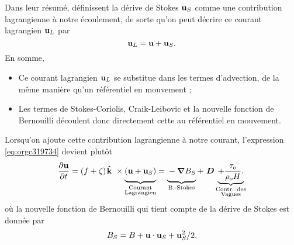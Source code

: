\documentclass[10pt]{article}
\numberwithin{equation}{section}
\newcommand{\kvf}{\vb{\hat{k}}}
\newcommand{\uu}{\vb{u}}
\newcommand{\grande}{\vphantom{\frac{1}{xx}}}
\newcommand{\pt}{\hspace{1pt}} %
\begin{document}
Dans leur résumé, \Textcite{suzuki2016understanding}  définissent la dérive de Stokes \(\uu_S\) comme une contribution lagrangienne à notre écoulement, de sorte qu'on peut décrire ce courant lagrangien \(\uu_L\) par
\begin{equation}
   \uu_L = \uu + \uu_S.
\end{equation}
En somme, 
\begin{itemize}
\item Ce courant lagrangien \(\uu_L\) se substitue dans les termes d'advection, de la même manière qu'un référentiel en mouvement ;
\item Les termes de Stokes-Coriolis, Craik-Leibovic et la nouvelle fonction de Bernouilli découlent donc directement cette au référentiel en mouvement. \bigskip
\end{itemize}

Lorsqu'on ajoute cette contribution lagrangienne à notre courant, l'expression \ref{eq:orgc319734} devient plutôt
\begin{equation}
   \pdv{\uu}{t} = \qty(f+\zeta)\pt \kvf\ \times\underbrace{\grande\qty(\uu + \uu_S)}_{\substack{\text{Courant} \\ \text{Lagrangien}}} = \underbrace{\grande-\gradient{B_S}}_\text{B.-Stokes} + \ \boldsymbol{D} \underbrace{+ \frac{\tau_o}{\rho_o H}.}_{\substack{\text{Contr. des} \\ \text{Vagues}}}
\end{equation}
où la nouvelle fonction de Bernouilli qui tient compte de la dérive de Stokes est donnée par
\begin{align}
   B_S = B + \uu\cdot\uu_S + \uu_S^2/2.
\end{align}

\printbibliography
\end{document}
